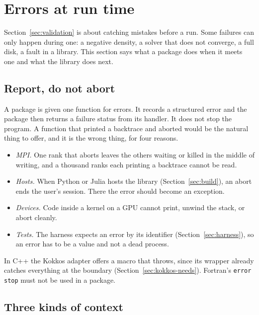 \documentclass[11pt,a4paper]{article}
\newcommand{\code}[1]{\texttt{#1}}
\begin{document}
\section{Errors at run time}
\label{sec:errors}

Section~\ref{sec:validation} is about catching mistakes before a run.  Some
failures can only happen during one: a negative density, a solver that
does not converge, a full disk, a fault in a library.  This section says
what a package does when it meets one and what the library does next.

\subsection{Report, do not abort}

A package is given one function for errors.  It records a structured error
and the package then returns a failure status from its handler.  It does
not stop the program.  A function that printed a backtrace and aborted
would be the natural thing to offer, and it is the wrong thing, for four
reasons.

\begin{itemize}
  \item \emph{MPI.}  One rank that aborts leaves the others waiting or
        killed in the middle of writing, and a thousand ranks each printing
        a backtrace cannot be read.
  \item \emph{Hosts.}  When Python or Julia hosts the library
        (Section~\ref{sec:build}), an abort ends the user's session.  There
        the error should become an exception.
  \item \emph{Devices.}  Code inside a kernel on a GPU cannot print, unwind
        the stack, or abort cleanly.
  \item \emph{Tests.}  The harness expects an error by its identifier
        (Section~\ref{sec:harness}), so an error has to be a value and not
        a dead process.
\end{itemize}

In C++ the Kokkos adapter offers a macro that throws, since its wrapper
already catches everything at the boundary (Section~\ref{sec:kokkos-needs}).
Fortran's \code{error stop} must not be used in a package.

\subsection{Three kinds of context}
\end{document}
